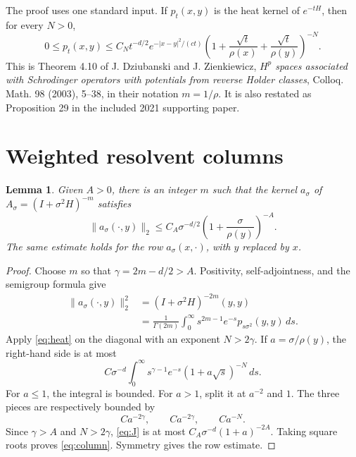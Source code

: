 \documentclass[11pt]{article}
\newtheorem{lemma}{Lemma}
\newcommand{\1}{\mathbf 1}
\begin{document}
The proof uses one standard input. If \(p_t(x,y)\) is the heat kernel of
\(e^{-tH}\), then for every \(N>0\),
\begin{equation}\label{eq:heat}
 0\leq p_t(x,y)\leq C_Nt^{-d/2}e^{-|x-y|^2/(ct)}
 \left(1+\frac{\sqrt t}{\rho(x)}+
              \frac{\sqrt t}{\rho(y)}\right)^{-N}.
\end{equation}
This is Theorem 4.10 of J. Dziubanski and J. Zienkiewicz,
\emph{\(H^p\) spaces associated with Schrodinger operators with potentials
from reverse Holder classes}, Colloq. Math. 98 (2003), 5--38, in their
notation \(m=1/\rho\). It is also restated as Proposition 29 in the included
2021 supporting paper.

\section*{Weighted resolvent columns}

\begin{lemma}\label{lem:columns}
Given \(A>0\), there is an integer \(m\) such that the kernel \(a_\sigma\) of
\(A_\sigma=(I+\sigma^2H)^{-m}\) satisfies
\begin{equation}\label{eq:column}
 \|a_\sigma(\cdot,y)\|_2
 \leq C_A\sigma^{-d/2}
 \left(1+\frac{\sigma}{\rho(y)}\right)^{-A}.
\end{equation}
The same estimate holds for the row \(a_\sigma(x,\cdot)\), with \(y\) replaced
by \(x\).
\end{lemma}

\begin{proof}
Choose \(m\) so that
\(\gamma=2m-d/2>A\). Positivity, self-adjointness, and the semigroup formula
give
\begin{align*}
 \|a_\sigma(\cdot,y)\|_2^2
 &= (I+\sigma^2H)^{-2m}(y,y)\\
 &=\frac1{\Gamma(2m)}\int_0^\infty
     s^{2m-1}e^{-s}p_{s\sigma^2}(y,y)\,ds.
\end{align*}
Apply \eqref{eq:heat} on the diagonal with an exponent \(N>2\gamma\). If
\(a=\sigma/\rho(y)\), the right-hand side is at most
\begin{equation}\label{eq:J}
 C\sigma^{-d}\int_0^\infty
 s^{\gamma-1}e^{-s}(1+a\sqrt s)^{-N}\,ds.
\end{equation}
For \(a\leq1\), the integral is bounded. For \(a>1\), split it at
\(a^{-2}\) and \(1\). The three pieces are respectively bounded by
\[
 C a^{-2\gamma},\qquad C a^{-2\gamma},\qquad C a^{-N}.
\]
Since \(\gamma>A\) and \(N>2\gamma\), \eqref{eq:J} is at most
\(C_A\sigma^{-d}(1+a)^{-2A}\). Taking square roots proves
\eqref{eq:column}. Symmetry gives the row estimate.
\end{proof}
\end{document}
